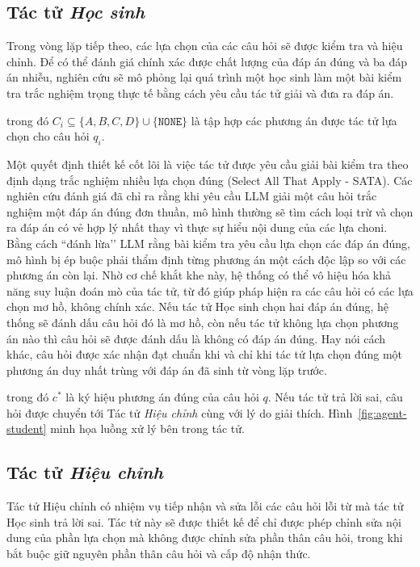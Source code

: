 \subsection{Tác tử \textit{Học sinh}}
Trong vòng lặp tiếp theo, các lựa chọn của các câu hỏi sẽ được kiểm tra và hiệu chỉnh. Để có thể đánh giá chính xác được chất lượng của đáp án đúng và ba đáp án nhiễu, nghiên cứu sẽ mô phỏng lại quá trình một học sinh làm một bài kiểm tra trắc nghiệm trọng thực tế bằng cách yêu cầu tác tử giải và đưa ra đáp án.

\noindent trong đó $C_i \subseteq \{A, B, C, D\} \cup \{\texttt{NONE}\}$ là tập hợp các phương án được tác tử lựa chọn cho câu hỏi $q_i$.

Một quyết định thiết kế cốt lõi là việc tác tử  được yêu cầu giải bài kiểm tra theo định dạng trắc nghiệm nhiều lựa chọn đúng (Select All That Apply - SATA). Các nghiên cứu đánh giá đã chỉ ra rằng khi yêu cầu LLM giải một câu hỏi trắc nghiệm một đáp án đúng đơn thuần, mô hình thường sẽ tìm cách loại trừ và chọn ra đáp án có vẻ hợp lý nhất thay vì thực sự hiểu nội dung của các lựa choni\cite{xu2025satabench}. Bằng cách ``đánh lừa’’ LLM rằng bài kiểm tra yêu cầu lựa chọn các đáp án đúng, mô hình bị ép buộc phải thẩm định từng phương án một cách độc lập so với các phương án còn lại. Nhờ cơ chế khắt khe này, hệ thống có thể vô hiệu hóa khả năng suy luận đoán mò của tác tử, từ đó giúp pháp hiện ra các câu hỏi có các lựa chọn mơ hồ, không chính xác. Nếu tác tử {Học sinh} chọn hai đáp án đúng, hệ thống sẽ đánh dấu câu hỏi đó là mơ hồ, còn nếu tác tử không lựa chọn phương án nào thì câu hỏi sẽ được đánh dấu là không có đáp án đúng. Hay nói cách khác, câu hỏi được xác nhận đạt chuẩn khi và chỉ khi tác tử lựa chọn đúng một phương án duy nhất trùng với đáp án đã sinh từ vòng lặp trước.

\noindent trong đó $c^*$ là ký hiệu phương án đúng của câu hỏi $q$. Nếu tác tử trả lời sai, câu hỏi được chuyển tới Tác tử \textit{Hiệu chỉnh} cùng với lý do giải thích. Hình~\ref{fig:agent-student} minh họa luồng xử lý bên trong tác tử.


\subsection{Tác tử \textit{Hiệu chỉnh}}
Tác tử {Hiệu chỉnh} có nhiệm vụ tiếp nhận và sửa lỗi các câu hỏi lỗi từ mà tác tử {Học sinh} trả lời sai. Tác tử này sẽ được thiết kế để chỉ được phép chỉnh sửa nội dung của phần lựa chọn mà không được chỉnh sửa phần thân câu hỏi, trong khi bắt buộc giữ nguyên phần thân câu hỏi và cấp độ nhận thức.

